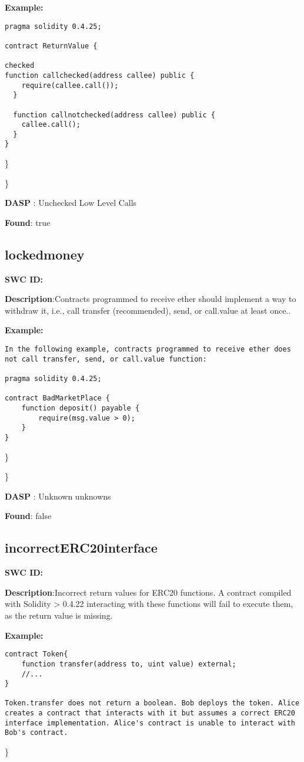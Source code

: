 \documentclass{article}
\begin{document}
\textbf{Example:} 
\begin{verbatim}
pragma solidity 0.4.25;

contract ReturnValue {

checked
function callchecked(address callee) public {
    require(callee.call());
  }

  function callnotchecked(address callee) public {
    callee.call();
  }
}

\end{verbatim}\} 

\} 

\textbf{DASP} : Unchecked Low Level Calls

\textbf{Found}: true

\subsection{locked\textunderscore money} 
\textbf{SWC \textunderscore ID:} 

\textbf{Description}:Contracts programmed to receive ether should implement a way to withdraw it, i.e., call transfer (recommended), send, or call.value at least once..


\textbf{Example:} 
\begin{verbatim}
In the following example, contracts programmed to receive ether does not call transfer, send, or call.value function:

pragma solidity 0.4.25;

contract BadMarketPlace {
    function deposit() payable {
        require(msg.value > 0);
    }
}

\end{verbatim}\} 

\} 

\textbf{DASP} : Unknown unknowns

\textbf{Found}: false

\subsection{incorrect\textunderscore ERC20\textunderscore interface} 
\textbf{SWC \textunderscore ID:} 

\textbf{Description}:Incorrect return values for ERC20 functions. A contract compiled with Solidity > 0.4.22 interacting with these functions will fail to execute them, as the return value is missing.


\textbf{Example:} 
\begin{verbatim}
contract Token{
    function transfer(address to, uint value) external;
    //...
}

Token.transfer does not return a boolean. Bob deploys the token. Alice creates a contract that interacts with it but assumes a correct ERC20 interface implementation. Alice's contract is unable to interact with Bob's contract.

\end{verbatim}\} 
\end{document}
